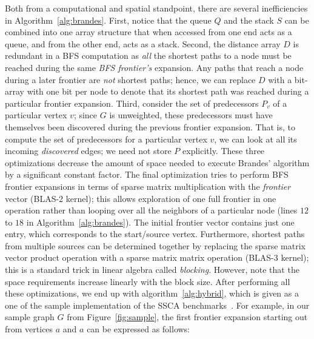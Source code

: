 %
Both from a computational and spatial standpoint, there are several
inefficiencies in Algorithm~\ref{alg:brandes}.
%
First, notice that the queue $Q$ and the stack $S$ can be combined into one
array structure that when accessed from one end acts as a queue, and from the
other end, acts as a stack.
%
Second, the distance array $D$ is redundant in a BFS computation as
\textit{all} the shortest paths to a node must be reached during the same
\textit{BFS frontier's} expansion.
%
Any paths that reach a node during a later frontier are \textit{not} shortest
paths; hence, we can replace $D$ with a bit-array with one bit per node to
denote that its shortest path was reached during a particular frontier
expansion.
%
Third, consider the set of predecessors $P_v$ of a particular vertex $v$; since
$G$ is unweighted, these predecessors must have themselves been discovered 
during the previous frontier expansion.
%
That is, to compute the set of predecessors for a particular vertex $v$, we can
look at all its incoming \textit{discovered} edges; we need not store $P$ 
explicitly.
%
These three optimizations decrease the amount of space needed to execute
Brandes' algorithm by a significant constant factor.
%
The final optimization tries to perform BFS frontier expansions in terms of
sparse matrix multiplication with the \textit{frontier} vector (BLAS-2 kernel);
this allows exploration of one full frontier in one operation rather than
looping over all the neighbors of a particular node (lines $12$ to $18$ in
Algorithm~\ref{alg:brandes}).
%
The initial frontier vector contains just one entry, which corresponds to the 
start/source vertex.
%
Furthermore, shortest paths from multiple sources can be determined together by
replacing the sparse matrix vector product operation with a sparse matrix
matrix operation (BLAS-3 kernel); this is a standard trick in linear algebra
called \textit{blocking}.
%
However, note that the space requirements increase linearly with the block 
size.
%
After performing all these optimizations, we end up with
algorithm~\ref{alg:hybrid}, which is given as a one of the sample
implementation of the SSCA benchmarks~\cite{ssca_matlab}.
%
For example, in our sample graph $G$ from Figure~\ref{fig:sample}, the first 
frontier expansion starting out from vertices $a$ and $a$ can be expressed as
follows:

